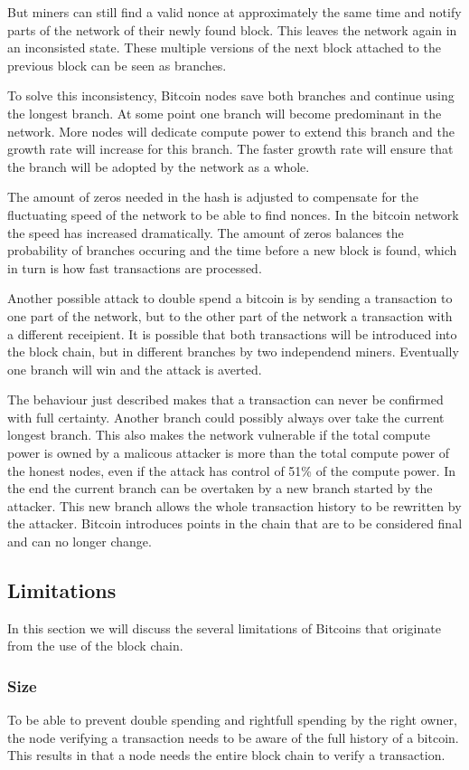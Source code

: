 But miners can still find a valid nonce at approximately the same time
and notify parts of the network of their newly found block.
This leaves the network again in an inconsisted state.
These multiple versions of the next block attached to the previous block can be seen as branches.

To solve this inconsistency, Bitcoin nodes save both branches and continue using the longest branch.
At some point one branch will become predominant in the network.
More nodes will dedicate compute power to extend this branch and the growth rate will increase for this branch.
The faster growth rate will ensure that the branch will be adopted by the network as a whole.

The amount of zeros needed in the hash is adjusted to compensate for the fluctuating speed of the network to be able to find nonces.
In the bitcoin network the speed has increased dramatically.
The amount of zeros balances the probability of branches occuring
and the time before a new block is found,
which in turn is how fast transactions are processed.

Another possible attack to double spend a bitcoin is by sending a transaction to one part of the network,
but to the other part of the network a transaction with a different receipient.
It is possible that both transactions will be introduced into the block chain, but in different branches by two independend miners.
Eventually one branch will win and the attack is averted.

The behaviour just described makes that a transaction can never be confirmed with full certainty.
Another branch could possibly always over take the current longest branch.
This also makes the network vulnerable if the total compute power is owned by a malicous attacker is more than the total compute power of the honest nodes, 
even if the attack has control of 51\% of the compute power. 
In the end the current branch can be overtaken by a new branch started by the attacker.
This new branch allows the whole transaction history to be rewritten by the attacker.
Bitcoin introduces points in the chain that are to be considered final and can no longer change.

\subsection{Limitations}
In this section we will discuss the several limitations of Bitcoins
that originate from the use of the block chain.

\subsubsection{Size}
To be able to prevent double spending and rightfull spending by the right owner, 
the node verifying a transaction needs to be aware of the full history of a bitcoin.
This results in that a node needs the entire block chain to verify a transaction.

